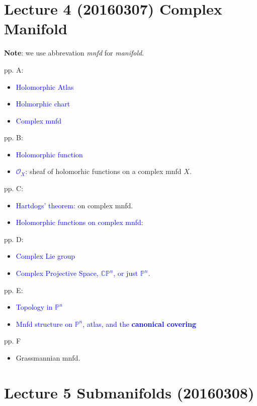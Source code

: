 \documentclass{book}
\numberwithin{equation}{subsection} %
\theoremstyle{definition}
\begin{document}
\section{Lecture 4 (20160307) Complex Manifold}

\textbf{Note}: we use abbrevation \textit{mnfd} for \textit{manifold}.

pp. A:
    \begin{itemize}
        \item \textcolor{blue}{Holomorphic Atlas}
        \item \textcolor{blue}{Holmorphic chart}
        \item \textcolor{blue}{Complex mnfd}
    \end{itemize}

pp. B:
    \begin{itemize}
        \item \textcolor{blue}{Holomorphic function}
        \item \textcolor{blue}{$\mathcal{O}_X$}: sheaf of holomorhic functions on a complex mnfd $X$.
    \end{itemize}
pp. C:
    \begin{itemize}
        \item \textcolor{blue}{Hartdogs' theorem}: on complex mnfd.
        \item \textcolor{blue}{Holomorphic functions on complex mnfd}:
    \end{itemize}
pp. D:
    \begin{itemize}
        \item \textcolor{blue}{Complex Lie group}
        \item \textcolor{blue}{Complex Projective Space, $\mathbb{CP}^n$, or just $\mathbb{P}^n$}.
    \end{itemize}
pp. E:
    \begin{itemize}
        \item \textcolor{blue}{Topology in $\mathbb{P}^n$}
        \item \textcolor{blue}{Mnfd structure on $\mathbb{P}^n$, atlas, and the \textbf{canonical covering}}
    \end{itemize}
pp. F
    \begin{itemize}
        \item Grassmannian mnfd.
    \end{itemize}

\section{Lecture 5 Submanifolds (20160308)}
\end{document}
